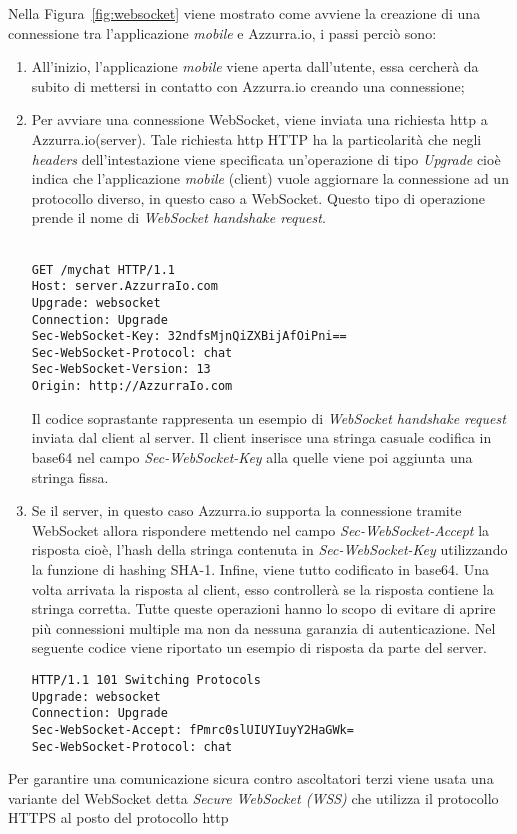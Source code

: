 Nella Figura~\ref{fig:websocket} viene mostrato come avviene la creazione di una connessione tra l'applicazione \emph{mobile} e Azzurra.io, i passi perciò sono:
\begin{enumerate}
	\item All'inizio, l'applicazione \emph{mobile} viene aperta dall'utente, essa cercherà da subito di mettersi in contatto con Azzurra.io creando una connessione;
	\item Per avviare una connessione \gls{WebSocket}\ap{[g]}, viene inviata una richiesta \gls{http}\ap{[g]} a Azzurra.io(\gls{server}\ap{[g]}). Tale richiesta \gls{http}\ap{[g]} HTTP ha la particolarità che negli \emph{headers} dell’intestazione viene specificata un'operazione di tipo \emph{Upgrade} cioè indica che l'applicazione \emph{mobile} (\gls{client}\ap{[g]}) vuole aggiornare la connessione ad un protocollo diverso, in questo caso a \gls{WebSocket}\ap{[g]}. Questo tipo di operazione prende il nome di \emph{WebSocket handshake request}.\\ \\
	\begin{lstlisting}
GET /mychat HTTP/1.1
Host: server.AzzurraIo.com
Upgrade: websocket	
Connection: Upgrade		
Sec-WebSocket-Key: 32ndfsMjnQiZXBijAfOiPni==
Sec-WebSocket-Protocol: chat		
Sec-WebSocket-Version: 13		
Origin: http://AzzurraIo.com
	\end{lstlisting}
	Il codice soprastante rappresenta un esempio di \emph{WebSocket handshake request} inviata dal \gls{client}\ap{[g]} al \gls{server}\ap{[g]}. Il \gls{client}\ap{[g]} inserisce una stringa casuale codifica in base64 nel campo \emph{Sec-WebSocket-Key} alla quelle viene poi aggiunta una stringa fissa.
	\item Se il \gls{server}\ap{[g]}, in questo caso Azzurra.io supporta la connessione tramite \gls{WebSocket}\ap{[g]} allora rispondere mettendo nel campo \emph{Sec-WebSocket-Accept} la risposta cioè, l'hash della stringa contenuta in \emph{Sec-WebSocket-Key} utilizzando la funzione di hashing SHA-1. Infine, viene tutto codificato in base64. Una volta arrivata la risposta al \gls{client}\ap{[g]}, esso controllerà se la risposta contiene la stringa corretta. Tutte queste operazioni hanno lo scopo di evitare di aprire più connessioni multiple ma non da nessuna garanzia di autenticazione.
	Nel seguente codice viene riportato un esempio di risposta da parte del server.\\
	\begin{lstlisting}
HTTP/1.1 101 Switching Protocols
Upgrade: websocket
Connection: Upgrade
Sec-WebSocket-Accept: fPmrc0slUIUYIuyY2HaGWk=
Sec-WebSocket-Protocol: chat
	\end{lstlisting}
\end{enumerate}
Per garantire una comunicazione sicura contro ascoltatori terzi viene usata una variante del \gls{WebSocket}\ap{[g]} detta \emph{Secure WebSocket (WSS)} che utilizza il protocollo HTTPS al posto del protocollo \gls{http}\ap{[g]}
